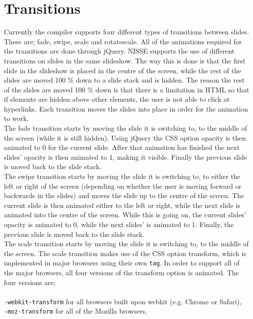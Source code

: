 \section{Transitions}
Currently the compiler supports four different types of transitions between slides. These are; fade, swipe, scale and rotatescale. All of the animations required for the transitions are done through jQuery. NISSE supports the use of different transitions on slides in the same slideshow. The way this is done is that the first slide in the slideshow is placed in the centre of the screen, while the rest of the slides are moved 100 \% down to a slide stack and is hidden. The reason the rest of the slides are moved 100 \% down is that there is a limitation in HTML so that if elements are hidden above other elements, the user is not able to click at hyperlinks. Each transition moves the slides into place in order for the animation to work.\\
The fade transition starts by moving the slide it is switching to, to the middle of the screen (while it is still hidden). Using jQuery the CSS option opacity is then animated to 0 for the current slide. After that animation has finished the next slides' opacity is then animated to 1, making it visible. Finally the previous slide is moved back to the slide stack. \\
The swipe transition starts by moving the slide it is switching to, to either the left or right of the screen (depending on whether the user is moving forward or backwards in the slides) and moves the slide up to the centre of the screen. The current slide is then animated either to the left or right, while the next slide is animated into the centre of the screen. While this is going on, the current slides' opacity is animated to 0, while the next slides' is animated to 1. Finally, the previous slide is moved back to the slide stack. \\
The scale transition starts by moving the slide it is switching to, to the middle of the screen. The scale transition makes use of the CSS option transform, which is implemented in major browsers using their own \texttt{tag}. In order to support all of the major browsers, all four versions of the transform option is animated. The four versions are; \\ \\
\texttt{-webkit-transform} for all browsers built upon webkit (e.g. Chrome or Safari), \\
\texttt{-moz-transform} for all of the Mozilla browsers, \\

